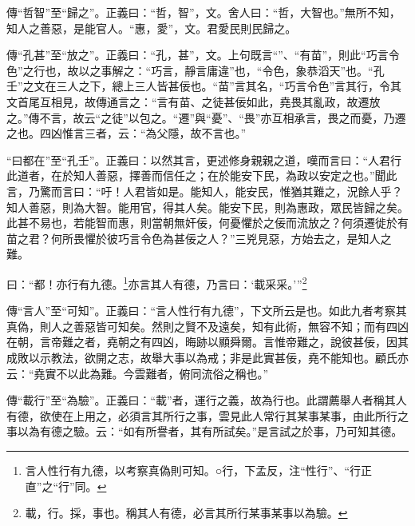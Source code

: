 {\noindent\zhuan{}\fzbyks 傳“哲智”至“歸之”。正義曰：“哲，智”，文。舍人曰：“哲，大智也。”無所不知，知人之善惡，是能官人。“惠，愛”，文。君愛民則民歸之。 \par}

{\noindent\zhuan{}\fzbyks 傳“孔甚”至“放之”。正義曰：“孔，甚”，文。上句既言“”、“有苗”，則此“巧言令色”之行也，故以之事解之：“巧言，靜言庸違”也，“令色，象恭滔天”也。“孔壬”之文在三人之下，總上三人皆甚佞也。“苗”言其名，“巧言令色”言其行，令其文首尾互相見，故傳通言之：“言有苗、之徒甚佞如此，堯畏其亂政，故遷放之。”傳不言，故云“之徒”以包之。“遷”與“憂”、“畏”亦互相承言，畏之而憂，乃遷之也。四凶惟言三者，云：“為父隱，故不言也。” \par}

{\noindent\shu{}\fzkt “曰都在”至“孔壬”。正義曰：以然其言，更述修身親親之道，嘆而言曰：“人君行此道者，在於知人善惡，擇善而信任之；在於能安下民，為政以安定之也。”聞此言，乃驚而言曰：“吁！人君皆如是。能知人，能安民，惟猶其難之，況餘人乎？知人善惡，則為大智。能用官，得其人矣。能安下民，則為惠政，眾民皆歸之矣。此甚不易也，若能智而惠，則當朝無奸佞，何憂懼於之佞而流放之？何須遷徙於有苗之君？何所畏懼於彼巧言令色為甚佞之人？”三兇見惡，方始去之，是知人之難。 \par}

曰：“都！亦行有九德。\footnote{言人性行有九德，以考察真偽則可知。○行，下孟反，注“性行”、“行正直”之“行”同。}亦言其人有德，乃言曰：‘載采采。’”\footnote{載，行。採，事也。稱其人有德，必言其所行某事某事以為驗。}


{\noindent\zhuan{}\fzbyks 傳“言人”至“可知”。正義曰：“言人性行有九德”，下文所云是也。如此九者考察其真偽，則人之善惡皆可知矣。然則之賢不及遠矣，知有此術，無容不知；而有四凶在朝，言帝難之者，堯朝之有四凶，晦跡以顯舜爾。言惟帝難之，說彼甚佞，因其成敗以示教法，欲開之志，故舉大事以為戒；非是此實甚佞，堯不能知也。顧氏亦云：“堯實不以此為難。今雲難者，俯同流俗之稱也。” \par}

{\noindent\zhuan{}\fzbyks 傳“載行”至“為驗”。正義曰：“載”者，運行之義，故為行也。此謂薦舉人者稱其人有德，欲使在上用之，必須言其所行之事，雲見此人常行其某事某事，由此所行之事以為有德之驗。云：“如有所譽者，其有所試矣。”是言試之於事，乃可知其德。 \par}

